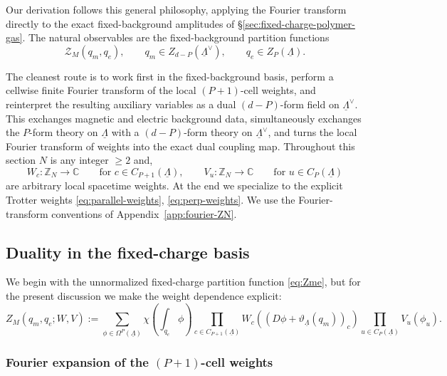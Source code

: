 Our derivation follows this general philosophy, applying the
Fourier transform directly to the exact fixed-background amplitudes of
\S\ref{sec:fixed-charge-polymer-gas}. The natural observables are the fixed-background partition functions
\begin{equation}
\mathcal Z_M(q_m,q_e),
\qquad
q_m\in Z_{d-P}(\underline\Lambda^\vee),
\qquad
q_e\in Z_P(\underline\Lambda).
\end{equation}

The cleanest route is to work first in the fixed-background basis, perform a cellwise
finite Fourier transform of the local \((P+1)\)-cell weights, and reinterpret the resulting
auxiliary variables as a dual \((d-P)\)-form field on \(\underline\Lambda^\vee\). This
exchanges magnetic and electric background data, simultaneously exchanges the \(P\)-form
theory on \(\underline\Lambda\) with a \((d-P)\)-form theory on
\(\underline\Lambda^\vee\), and turns the local Fourier transform of weights into the exact
dual coupling map. Throughout this section $N$ is any integer $\ge 2$ and,
\begin{equation}
W_c:\mathbb Z_N\to\mathbb C
\qquad \text{for } c\in C_{P+1}(\underline\Lambda),
\qquad
V_u:\mathbb Z_N\to\mathbb C
\qquad \text{for } u\in C_P(\underline\Lambda)
\end{equation}
are arbitrary local spacetime weights. At the end we specialize to the explicit Trotter
weights  \eqref{eq:parallel-weights}, \eqref{eq:perp-weights}. We use the Fourier-transform conventions of Appendix~\ref{app:fourier-ZN}.




\subsection{Duality in the fixed-charge basis}
\label{sec:KW-fixed-charge}

We begin with the unnormalized fixed-charge partition function
\eqref{eq:Zme}, but for the present discussion we make the weight
dependence explicit:
\begin{equation}
	Z_M(q_m,q_e;W,V)
	:=
	\sum_{\phi\in \Omega^P(\underline\Lambda)}
	\chi \left(\int_{q_e}\phi\right)
	\prod_{c\in C_{P+1}(\underline\Lambda)}
	W_c \left((D\phi+\vartheta_{\underline\Lambda}(q_m))_c\right)
	\prod_{u\in C_P(\underline\Lambda)}
	V_u(\phi_u).
	\label{eq:KW-raw-fixed-charge}
\end{equation}


\subsubsection{Fourier expansion of the \((P+1)\)-cell weights}


